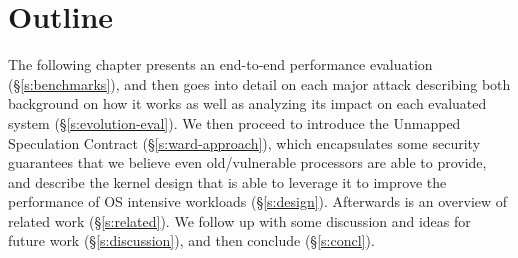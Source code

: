 \section{Outline}
The following chapter presents an end-to-end performance evaluation (\S\ref{s:benchmarks}), and then goes into detail on each major attack describing both background on how it works as well as analyzing its impact on each evaluated system (\S\ref{s:evolution-eval}).
We then proceed to introduce the Unmapped Speculation Contract (\S\ref{s:ward-approach}), which encapsulates some security guarantees that we believe even old/vulnerable processors are able to provide, and describe the \sys kernel design that is able to leverage it to improve the performance of OS intensive workloads (\S\ref{s:design}).
Afterwards is an overview of related work (\S\ref{s:related}).
We follow up with some discussion and ideas for future work (\S\ref{s:discussion}), and then conclude (\S\ref{s:concl}).
